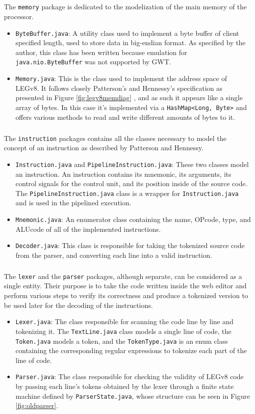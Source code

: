 \subparagraph{}
The \verb|memory| package is dedicated to the modelization of the main memory of the processor.
\begin{itemize}
\item \verb|ByteBuffer.java|:  A utility class used to implement a byte buffer of client specified length, used to store data in big-endian format. As specified by the author, this class has been written because emulation for \verb|java.nio.ByteBuffer| was not supported by GWT.
\item \verb|Memory.java|:  This is the class used to implement the address space of LEGv8. It follows closely Patterson's and Hennessy's specification as presented in Figure \ref{fig:legv8memdiag} , and as such it appears like a single array of bytes. In this case it's implemented via a \verb|HashMap<Long, Byte>| and offers various methods to read and write different amounts of bytes to it.
\end{itemize}
\subparagraph{}
The \verb|instruction| packages contains all the classes necessary to model the concept of an instruction as described by Patterson and Hennessy.
\begin{itemize}
	\item \verb|Instruction.java| and \verb|PipelineInstruction.java|: These two classes model an instruction. An instruction contains its mnemonic, its arguments, its control signals for the control unit, and its position inside of the source code. The \verb|PipelineInstruction.java| class is a wrapper for \verb|Instruction.java| and is used in the pipelined execution.
	\item \verb|Mnemonic.java|: An enumerator class containing the name, OPcode, type, and ALUcode of all of the implemented instructions.
	\item \verb|Decoder.java|: This class is responsible for taking the tokenized source code from the parser, and converting each line into a valid instruction. 
\end{itemize}
\subparagraph{}
The \verb|lexer| and the \verb|parser| packages, although separate, can be considered as a single entity. Their purpose is to take the code written inside the web editor and perform various steps to verify its correctness and produce a tokenized version to be used later for the decoding of the instructions.
\begin{itemize}
    \item \verb|Lexer.java|: The class responsible for scanning the code line by line and tokenizing it. The \verb|TextLine.java| class models a single line of code, the \verb|Token.java| models a token, and the \verb|TokenType.java| is an enum class containing the corresponding regular expressions to tokenize each part of the line of code.
    \item \verb|Parser.java|: The class responsible for checking the validity of LEGv8 code by passing each line's tokens obtained by the lexer through a finite state machine defined by \verb|ParserState.java|, whose structure can be seen in Figure \ref{fig:oldparser}.
\end{itemize}
